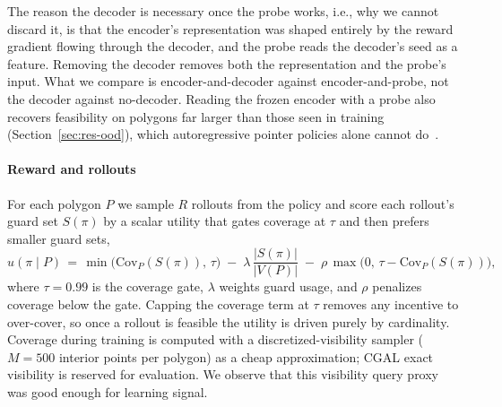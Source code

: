 \documentclass[preprint,10pt]{elsarticle}
\newcommand{\Covf}[1]{\mathrm{Cov}_P(#1)}
\begin{document}
The reason the decoder is necessary once the probe works, i.e., why we cannot discard it, is that the encoder's representation was shaped entirely by the reward gradient flowing through the decoder, and the probe reads the decoder's seed as a feature. Removing the decoder removes both the representation and the probe's input. What we compare is encoder-and-decoder against encoder-and-probe, not the decoder against no-decoder. Reading the frozen encoder with a probe also recovers feasibility on polygons far larger than those seen in training (Section~\ref{sec:res-ood}), which autoregressive pointer policies alone cannot do~\cite{Vinyals2015,Jin2023Pointerformer}.

\paragraph{Reward and rollouts} For each polygon $P$ we sample $R$ rollouts from the policy and score each rollout's guard set $S(\pi)$ by a scalar utility that gates coverage at $\tau$ and then prefers smaller guard sets,
\begin{equation}
u(\pi \mid P) \,=\, \min\!\big(\Covf{S(\pi)},\, \tau\big) \;-\; \lambda\,\frac{|S(\pi)|}{|V(P)|} \;-\; \rho\,\max\!\big(0,\, \tau - \Covf{S(\pi)}\big),
\label{eq:reward}
\end{equation}
where $\tau = 0.99$ is the coverage gate, $\lambda$ weights guard usage, and $\rho$ penalizes coverage below the gate. Capping the coverage term at $\tau$ removes any incentive to over-cover, so once a rollout is feasible the utility is driven purely by cardinality. Coverage during training is computed with a discretized-visibility sampler ($M = 500$ interior points per polygon) as a cheap approximation; CGAL exact visibility is reserved for evaluation. We observe that this visibility query proxy was good enough for learning signal.
\end{document}
